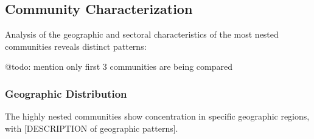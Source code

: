 \documentclass[12pt]{article}
\begin{document}
\subsection{Community Characterization}

Analysis of the geographic and sectoral characteristics of the most nested communities reveals distinct patterns:

@todo: mention only first 3 communities are being compared

\subsubsection{Geographic Distribution}

The highly nested communities show concentration in specific geographic regions, with [DESCRIPTION of geographic patterns].
\end{document}
